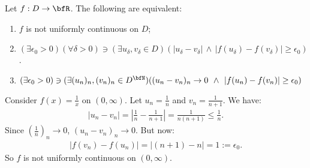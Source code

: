     \begin{proposition}
        Let $f:D \rightarrow \bfR$. The following are equivalent:
            \begin{enumerate}[label = (\arabic*)]
                \item $f$ is not uniformly continuous on $D$;
                \item  $(\exists \epsilon_0 > 0)(\forall \delta > 0) \ni (\exists u_\delta,v_\delta \in D)(|u_\delta - v_\delta| \hspace{2pt}\land \hspace{2pt}|f(u_\delta) - f(v_\delta)| \geq \epsilon_0)$.
                \item $(\exists \epsilon_0 > 0) \ni (\exists (u_n)_n,(v_n)_n \in D^\bfN)((u_n - v_n)_n \rightarrow 0 \hspace{4pt}\land\hspace{4pt} |f(u_n) - f(v_n)| \geq \epsilon_0)$
            \end{enumerate}
    \end{proposition}

    \begin{example}
        Consider $f(x) = \frac{1}{x}$ on $(0, \infty)$. Let $u_n = \frac{1}{n}$ and $v_n = \frac{1}{n+1}$. We have:
            \begin{equation*}
            \begin{split}
                |u_n - v_n| = \left| \frac{1}{n} - \frac{1}{n+1}\right| = \frac{1}{n(n+1)} \leq \frac{1}{n}.
            \end{split}
            \end{equation*}
        Since $\left(\frac{1}{n}\right)_n \rightarrow 0$, $(u_n - v_n)_n \rightarrow 0$. But now:
            \begin{equation*}
            \begin{split}
                |f(v_n) - f(u_n)| = |(n+1) - n| = 1 := \epsilon_0.
            \end{split}
            \end{equation*}
        So $f$ is not uniformly continuous on $(0,\infty)$.
    \end{example}

